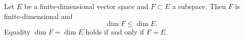 Let $E$ be a finite-dimensional vector space and $F \subset E$ a subspace. Then $F$ is finite-dimensional and
$$\dim F \leq \dim E.$$
Equality $\dim F = \dim E$ holds if and only if $F = E$.
